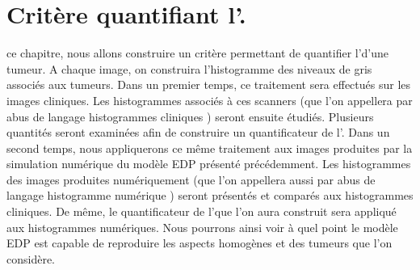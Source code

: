 \documentclass[main.tex]{subfiles}
\begin{document}



\chapter{Critère quantifiant l'\hetero. \label{chap:crit_hetero}}
 ce chapitre, nous allons construire un critère permettant de quantifier l'\hetero d'une tumeur.
A chaque image, on construira l'histogramme des niveaux de gris associés aux tumeurs. 
Dans un premier temps, ce traitement sera effectués sur les images cliniques. %
Les histogrammes associés à ces scanners (que l'on appellera par abus de langage \og histogrammes cliniques \fg) seront ensuite étudiés. Plusieurs quantités seront examinées afin de construire un quantificateur de l'\hetero.
Dans un second temps, nous appliquerons ce même traitement aux images produites par la simulation numérique du modèle EDP présenté précédemment. Les histogrammes des images produites numériquement (que l'on appellera aussi par abus de langage \og histogramme numérique \fg) seront présentés et comparés aux histogrammes cliniques. De même, le quantificateur de l'\hetero que l'on aura construit sera appliqué aux histogrammes numériques. Nous pourrons ainsi voir à quel point le modèle EDP est capable de reproduire les aspects homogènes et \heterogenes des tumeurs que l'on considère.
\end{document}
